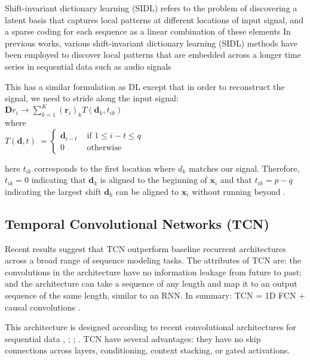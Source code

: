 \documentclass[11pt,a4paper]{article}
\begin{document}
Shift-invariant dictionary learning (SIDL) refers to the problem of discovering a latent basis that captures local patterns at different locations of input signal, and a sparse coding for each sequence as a linear combination of these elements \cite{Zheng2016} In previous works, various shift-invariant dictionary learning (SIDL) methods have been employed to discover local patterns that are embedded across a longer time series in sequential data such as audio signals  \cite{Grosse2007}  

This has a similar formulation as DL except that in order to reconstruct the signal, we need to stride along the input signal:  \\
$\mathbf{D} r_{i} \longrightarrow \sum_{k=1}^{K} (\boldsymbol{r}_{i})_{k} T\left(\mathbf{d}_{k}, t_{i k}\right)$
\\
where \\
$T(\mathbf{d}, t) \ =\begin{cases}\mathbf{d}_{i-t} & \text { if } 1 \leq i-t \leq q \\ 0 & \text { otherwise }\end{cases}$

here $t_{i k}$ corresponds to the first location where $d_k$ matches our signal. Therefore, $t_{i k}=0$ indicating that $\mathbf{d}_{k}$ is aligned to the beginning of $\mathbf{x}_{i}$ and that $t_{i k}=p-q$ indicating the largest shift $\mathbf{d}_{k}$ can be aligned to $\mathbf{x}_{i}$ without running beyond \cite{Zheng2016}. 





\subsection{Temporal Convolutional Networks (TCN) }

Recent results suggest that TCN outperform
baseline recurrent architectures across a broad range of sequence modeling tasks. The attributes of TCN are: the convolutions in the architecture have no information leakage from future to past; and the architecture can take a sequence of any length and map it to
an output sequence of the same length, similar to an RNN. In summary: TCN = 1D FCN + causal convolutions \cite{ShaojieBai2018}.

This architecture is designed according to recent convolutional architectures for sequential data \cite{oord2016wavenet},
\cite{kalchbrenner2017neural} ; \cite{DBLP:journals/corr/DauphinFAG16}; \cite{Zheng2016}. TCN have several advantages: they have no skip connections across layers, conditioning, context stacking, or gated activations.
\end{document}

